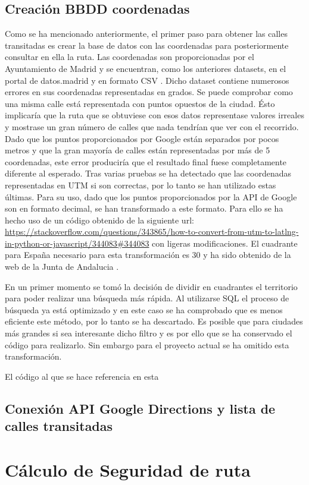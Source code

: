 \subsection{Creación BBDD coordenadas}
Como se ha mencionado anteriormente, el primer paso para obtener las calles transitadas es crear la base de datos con las coordenadas para posteriormente consultar en ella la ruta.
Las coordenadas son proporcionadas por el Ayuntamiento de Madrid y se encuentran, como los anteriores datasets, en el portal de datos.madrid y en formato CSV \cite{coordenadas_DatosMadrid}.
Dicho dataset contiene numerosos errores en sus coordenadas representadas en grados. Se puede comprobar como una misma calle está representada con puntos opuestos de la ciudad. Ésto implicaría que la ruta que se obtuviese con esos datos representase valores irreales y mostrase un gran número de calles que nada tendrían que ver con el recorrido. Dado que los puntos proporcionados por Google están separados por pocos metros y que la gran mayoría de calles están representadas por más de 5 coordenadas, este error produciría que el resultado final fuese completamente diferente al esperado.
Tras varias pruebas se ha detectado que las coordenadas representadas en UTM si son correctas, por lo tanto se han utilizado estas últimas. Para su uso, dado que los puntos proporcionados por la API de Google son en formato decimal, se han transformado a este formato. Para ello se ha hecho uso de un código obtenido de la siguiente url: \url{https://stackoverflow.com/questions/343865/how-to-convert-from-utm-to-latlng-in-python-or-javascript/344083#344083} con ligeras modificaciones. El cuadrante para España necesario para esta transformación es 30 y ha sido obtenido de la web de la Junta de Andalucia \cite{UTM_cuadrante_andalucia}.

En un primer momento se tomó la decisión de dividir en cuadrantes el territorio para poder realizar una búsqueda más rápida. Al utilizarse SQL el proceso de búsqueda ya está optimizado y en este caso se ha comprobado que es menos eficiente este método, por lo tanto se ha descartado. Es posible que para ciudades más grandes si sea interesante dicho filtro y es por ello que se ha conservado el código para realizarlo. Sin embargo para el proyecto actual se ha omitido esta transformación.

El código al que se hace referencia en esta

\subsection{Conexión API Google Directions y lista de calles transitadas}


\section{Cálculo de Seguridad de ruta}


